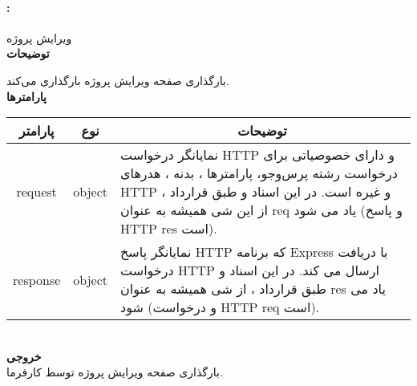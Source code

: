\paragraph{:}
 ویرایش پروژه‌ 
\\
\textbf{توضیحات}
\hr
\begin{flushleft}
	\framebox[.9\textwidth][l]{
		\lr{
			\textcolor{type}{void}
			\textcolor{func}{getEditProject}
			\textcolor{symb}{(}
			\textcolor{type}{object}
			\textcolor{arg}{request}
			\textcolor{symb}{,}
			\textcolor{type}{object}
			\textcolor{arg}{response}
			\textcolor{symb}{);}
		}
	}
\end{flushleft}
بارگذاری صفحه ویرایش پروژه بارگذاری می‌کند.
\\
\textbf{پارامترها}
\hr \\[10pt]
\begin{tabular}{|m{4cm}|m{3cm}|m{10cm}|}
	\hline
	\multicolumn{1}{|c}{پارامتر}
	&
	\multicolumn{1}{|c}{نوع}
	&
	\multicolumn{1}{|c|}{توضیحات}
	\\
	\hline
	\multicolumn{1}{|c}{request}
	&
	\multicolumn{1}{|c|}{object}
	&
	نمایانگر درخواست HTTP و دارای خصوصیاتی برای درخواست رشته پرس‌و‌جو، پارامترها ، بدنه ، هدرهای HTTP و غیره است.
	در این اسناد و طبق قرارداد ، از این شی همیشه به عنوان req یاد می شود (و پاسخ HTTP res است).
	\\
	\hline
	\multicolumn{1}{|c}{response}
	&
	\multicolumn{1}{|c|}{object}
	&
	نمایانگر پاسخ HTTP که برنامه Express با دریافت درخواست HTTP ارسال می کند.
	در این اسناد و طبق قرارداد ، از شی همیشه به عنوان res یاد می شود (و درخواست HTTP req است).
	\\
	\hline
\end{tabular}
\\[10pt]
\textbf{خروجی}
\hr \\
بارگذاری صفحه ویرایش پروژه توسط کارفرما.


